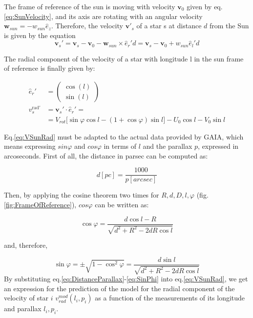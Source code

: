 \noindent
The frame of reference of the sun is moving with velocity $\bm{v}_0$ given by eq.\ref{eq:SunVelocity}, and its axis are rotating with an angular velocity $\bm{w}_{sun} = -w_{sun} \hat{e}_z$. Therefore, the velocity $\bm{v'}_s$ of a star s at distance $d$ from the Sun is given by the equation
\begin{equation}\label{eq:ReferenceFrame}
    \bm{v}_s' = \bm{v}_s - \bm{v}_0 - \bm{w}_{sun} \times \hat{e}_r' d = \bm{v}_s - \bm{v}_0 + w_{sun} \hat{e}_l' d
\end{equation}
\noindent 


\noindent 
The radial component of the velocity of a star with longitude l in the sun frame of reference is finally given by:

\begin{equation}\label{eq:VSunRad}
    \begin{aligned}
        \hat{e}_r' &= \begin{pmatrix} \cos(l) \\ \sin(l) \end{pmatrix} \\
        v_s^{\text{rad}'}  &= \bm{v}_s' \cdot \hat{e}_r' = \\ 
        &=V_{rot} \biggl[ \sin\varphi \cos l - (1 + \cos\varphi)\sin l \biggr] - U_0 \cos l - V_0 \sin l
    \end{aligned}
\end{equation}
\noindent




Eq.\ref{eq:VSunRad} must be adapted to the actual data provided by GAIA, which means expressing $sin\varphi$ and $cos\varphi$ in terms of $l$ and the parallax $p$, expressed in arcoseconds. First of all, the distance in parsec can be computed as:

\begin{equation}\label{eq:DistanceParallax}
    d[pc] = \frac{1000}{p[arcsec]}
\end{equation}

\noindent
Then, by applying the cosine theorem two times for $R, d, D, l, \varphi$ (fig.\ref{fig:FrameOfReference}), $cos\varphi$ can be written as:

\begin{equation}\label{eq:CosPhi}
    \cos\varphi = \frac{d \cos l - R}{\sqrt{d^2 + R^2 - 2dR \cos l}}
\end{equation}

\noindent
and, therefore,

\begin{equation}\label{eq:SinPhi}
    \sin\varphi = \pm \sqrt{1 - \cos^2 \varphi} = \frac{d\sin l}{\sqrt{d^2 + R^2 -2dR \cos l}}
\end{equation}
\noindent
By substituting eq.\ref{eq:DistanceParallax}-\ref{eq:SinPhi} into eq.\ref{eq:VSunRad}, we get an expression for the prediction of the model for the radial component of the velocity of star $i$ $v_{rad}^{mod}(l_i, p_i)$ as a function of the measurements of its longitude and parallax $l_i, p_i$.